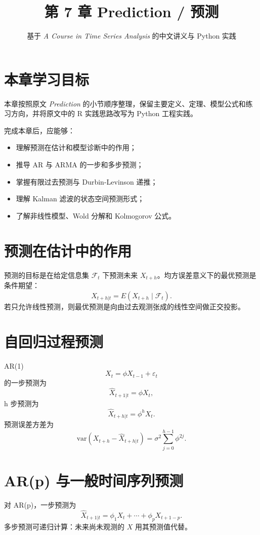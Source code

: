 \documentclass[11pt,a4paper]{ctexart}
\title{第 7 章 \quad Prediction / 预测}
\author{基于 \textit{A Course in Time Series Analysis} 的中文讲义与 Python 实践}
\date{}
\begin{document}
\maketitle

\section*{本章学习目标}

本章按照原文 \textit{Prediction} 的小节顺序整理，保留主要定义、定理、模型公式和练习方向，并将原文中的 R 实践思路改写为 Python 工程实践。

完成本章后，应能够：
\begin{itemize}
  \item 理解预测在估计和模型诊断中的作用；
  \item 推导 AR 与 ARMA 的一步和多步预测；
  \item 掌握有限过去预测与 Durbin-Levinson 递推；
  \item 理解 Kalman 滤波的状态空间预测形式；
  \item 了解非线性模型、Wold 分解和 Kolmogorov 公式。
\end{itemize}

\section{预测在估计中的作用}

预测的目标是在给定信息集 \(\mathcal F_t\) 下预测未来 \(X_{t+h}\)。均方误差意义下的最优预测是条件期望：
\[
  \hat X_{t+h|t}=E(X_{t+h}\mid\mathcal F_t).
\]
若只允许线性预测，则最优预测是向由过去观测张成的线性空间做正交投影。

\section{自回归过程预测}

AR(1)
\[
  X_t=\phi X_{t-1}+\varepsilon_t
\]
的一步预测为
\[
  \hat X_{t+1|t}=\phi X_t,
\]
h 步预测为
\[
  \hat X_{t+h|t}=\phi^hX_t.
\]
预测误差方差为
\[
  \mathrm{var}(X_{t+h}-\hat X_{t+h|t})
  =\sigma^2\sum_{j=0}^{h-1}\phi^{2j}.
\]

\section{AR(p) 与一般时间序列预测}

对 AR(p)，一步预测为
\[
  \hat X_{t+1|t}=\phi_1X_t+\cdots+\phi_pX_{t+1-p}.
\]
多步预测可递归计算：未来尚未观测的 \(X\) 用其预测值代替。
\end{document}
